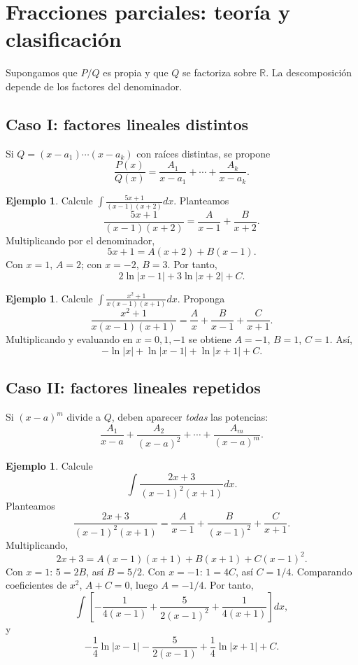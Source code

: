 \documentclass[12pt]{article}
\theoremstyle{definition}\newtheorem{definicion}[teorema]{Definición}\newtheorem{ejemplo}[teorema]{Ejemplo}\newtheorem{ejercicio}[teorema]{Ejercicio}
\theoremstyle{remark}\newtheorem*{observacion}{Observación}\newtheorem*{advertencia}{Advertencia}\newtheorem*{estrategia}{Estrategia}
\newcommand{\R}{\mathbb{R}}\newcommand{\dd}{\,dx}\newcommand{\du}{\,du}\newcommand{\dt}{\,dt}
\begin{document}
\section{Fracciones parciales: teoría y clasificación}
Supongamos que $P/Q$ es propia y que $Q$ se factoriza sobre $\R$. La descomposición depende de los factores del denominador.
\subsection{Caso I: factores lineales distintos}
Si $Q=(x-a_1)\cdots(x-a_k)$ con raíces distintas, se propone
\[\frac{P(x)}{Q(x)}=\frac{A_1}{x-a_1}+\cdots+\frac{A_k}{x-a_k}.\]
\begin{ejemplo}Calcule $\int\frac{5x+1}{(x-1)(x+2)}dx$. Planteamos
\[\frac{5x+1}{(x-1)(x+2)}=\frac{A}{x-1}+\frac{B}{x+2}.\]
Multiplicando por el denominador,
\[5x+1=A(x+2)+B(x-1).\]
Con $x=1$, $A=2$; con $x=-2$, $B=3$. Por tanto,
\[\boxed{2\ln|x-1|+3\ln|x+2|+C}.\]\end{ejemplo}
\begin{ejemplo}Calcule $\int\frac{x^2+1}{x(x-1)(x+1)}dx$. Proponga
\[\frac{x^2+1}{x(x-1)(x+1)}=\frac{A}{x}+\frac{B}{x-1}+\frac{C}{x+1}.\]
Multiplicando y evaluando en $x=0,1,-1$ se obtiene $A=-1$, $B=1$, $C=1$. Así,
\[\boxed{-\ln|x|+\ln|x-1|+\ln|x+1|+C}.\]\end{ejemplo}

\subsection{Caso II: factores lineales repetidos}
Si $(x-a)^m$ divide a $Q$, deben aparecer \emph{todas} las potencias:
\[\frac{A_1}{x-a}+\frac{A_2}{(x-a)^2}+\cdots+\frac{A_m}{(x-a)^m}.\]
\begin{ejemplo}Calcule
\[\int\frac{2x+3}{(x-1)^2(x+1)}dx.\]
Planteamos
\[\frac{2x+3}{(x-1)^2(x+1)}=\frac{A}{x-1}+\frac{B}{(x-1)^2}+\frac{C}{x+1}.\]
Multiplicando,
\[2x+3=A(x-1)(x+1)+B(x+1)+C(x-1)^2.\]
Con $x=1$: $5=2B$, así $B=5/2$. Con $x=-1$: $1=4C$, así $C=1/4$. Comparando coeficientes de $x^2$, $A+C=0$, luego $A=-1/4$. Por tanto,
\[\int\left[-\frac1{4(x-1)}+\frac{5}{2(x-1)^2}+\frac1{4(x+1)}\right]dx,\]
y
\[\boxed{-\frac14\ln|x-1|-\frac{5}{2(x-1)}+\frac14\ln|x+1|+C}.\]\end{ejemplo}
\end{document}
